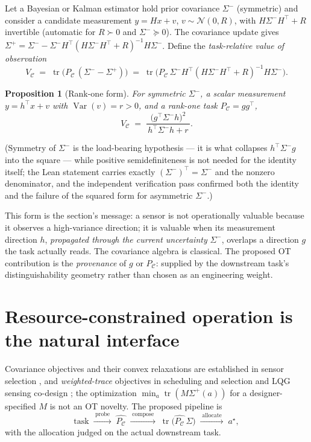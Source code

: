 \documentclass[letterpaper,onecolumn]{IEEEtran}
\newtheorem{proposition}{Proposition}
\theoremstyle{definition}
\theoremstyle{remark}
\newcommand{\PC}{P_{\mathcal{C}}}
\newcommand{\tr}{\operatorname{tr}}
\newcommand{\Sig}{\Sigma}
\newcommand{\Sm}{\Sigma^{-}}
\newcommand{\Sp}{\Sigma^{+}}
\newcommand{\VC}{V_{\mathcal{C}}}
\begin{document}
Let a Bayesian or Kalman estimator hold prior covariance $\Sm$ (symmetric)
and consider a candidate measurement $y=Hx+v$, $v\sim\mathcal N(0,R)$, with
$H\Sm H^{\top}+R$ invertible (automatic for $R\succ 0$ and $\Sm\succeq 0$).
The covariance update gives
$\Sp=\Sm-\Sm H^{\top}(H\Sm H^{\top}+R)^{-1}H\Sm$. Define the
\emph{task-relative value of observation}
\begin{equation}
\label{eq:voi}
\VC \;=\; \tr\!\big(\PC\,(\Sm-\Sp)\big)
\;=\; \tr\!\big(\PC\,\Sm H^{\top}(H\Sm H^{\top}+R)^{-1}H\Sm\big).
\end{equation}

\begin{proposition}[Rank-one form]
\label{prop:voi}
For symmetric $\Sm$, a scalar measurement $y=h^{\top}x+v$ with
$\operatorname{Var}(v)=r>0$, and a rank-one task $\PC=gg^{\top}$,
\begin{equation}
\label{eq:voirankone}
\VC \;=\; \frac{\big(g^{\top}\Sm h\big)^{2}}{\,h^{\top}\Sm h+r\,}.
\end{equation}
\end{proposition}

(Symmetry of $\Sm$ is the load-bearing hypothesis --- it is what collapses
$h^{\top}\Sm g$ into the square --- while positive semidefiniteness is not
needed for the identity itself; the Lean statement carries exactly
$(\Sm)^{\top}=\Sm$ and the nonzero denominator, and the independent
verification pass confirmed both the identity and the failure of the
squared form for asymmetric $\Sm$.)

This form is the section's message: a sensor is not operationally valuable
because it observes a high-variance direction; it is valuable when its
measurement direction $h$, \emph{propagated through the current uncertainty}
$\Sm$, overlaps a direction $g$ the task actually reads. The covariance
algebra is classical. The proposed OT contribution is the \emph{provenance}
of $g$ or $\PC$: supplied by the downstream task's distinguishability
geometry rather than chosen as an engineering weight.

\section{Resource-constrained operation is the natural interface}
\label{sec:resources}

Covariance objectives and their convex relaxations are established in
sensor selection \cite{joshiboyd2009}, and \emph{weighted-trace}
objectives in scheduling and selection \cite{unified2023} and LQG sensing
co-design \cite{tzoumas2021}; the optimization $\min_a \tr(M\Sp(a))$ for a
designer-specified $M$ is not an OT novelty. The proposed pipeline is
\begin{equation*}
\text{task} \;\xrightarrow{\;\text{probe}\;}\; \widehat{\PC}
\;\xrightarrow{\;\text{compose}\;}\; \tr\big(\widehat{\PC}\,\Sig\big)
\;\xrightarrow{\;\text{allocate}\;}\; a^{\star},
\end{equation*}
with the allocation judged on the actual downstream task.
\end{document}
